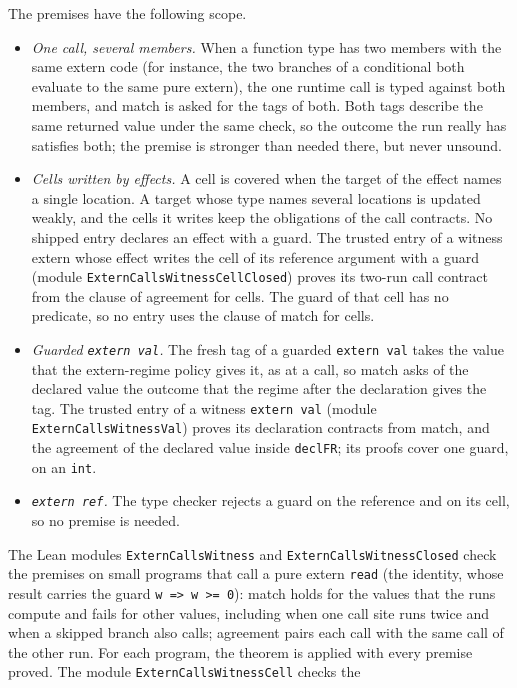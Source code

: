 \documentclass[12pt]{article}
\begin{document}
The premises have the following scope.
\begin{itemize}
  \item \emph{One call, several members.}  When a function type has two members
  with the same extern code (for instance, the two branches of a conditional
  both evaluate to the same pure extern), the one runtime call is typed against
  both members, and match is asked for the tags of both.  Both tags describe the
  same returned value under the same check, so the outcome the run really has
  satisfies both; the premise is stronger than needed there, but never
  unsound.
  \item \emph{Cells written by effects.}  A cell is covered when the target of
  the effect names a single location.  A target whose type names several
  locations is updated weakly, and the cells it writes keep the obligations of
  the call contracts.  No shipped entry declares an effect with a guard.  The
  trusted entry of a witness extern whose effect writes the cell of its
  reference argument with a guard (module \texttt{ExternCallsWitnessCellClosed})
  proves its two-run call contract from the clause of agreement for cells.  The
  guard of that cell has no predicate, so no entry uses the clause of match for
  cells.
  \item \emph{Guarded \texttt{extern val}.}  The fresh tag of a guarded
  \texttt{extern val} takes the value that the extern-regime policy gives it,
  as at a call, so match asks of the declared value the outcome that the regime
  after the declaration gives the tag.  The trusted entry of a witness
  \texttt{extern val} (module \texttt{ExternCallsWitnessVal}) proves its
  declaration contracts from match, and the agreement of the declared value
  inside \texttt{declFR}; its proofs cover one guard, on an \texttt{int}.
  \item \emph{\texttt{extern ref}.}  The type checker rejects a guard on the
  reference and on its cell, so no premise is needed.
\end{itemize}
The Lean modules \texttt{ExternCallsWitness} and
\texttt{ExternCallsWitnessClosed} check the premises on small
programs that call a pure extern \texttt{read} (the identity, whose result
carries the guard \texttt{w => w >= 0}): match holds for the values that the
runs compute and fails for other values, including when one call site runs
twice and when a skipped branch also calls; agreement pairs each call with the
same call of the other run.  For each program, the theorem is applied with
every premise proved.  The module \texttt{ExternCallsWitnessCell} checks the
\end{document}
